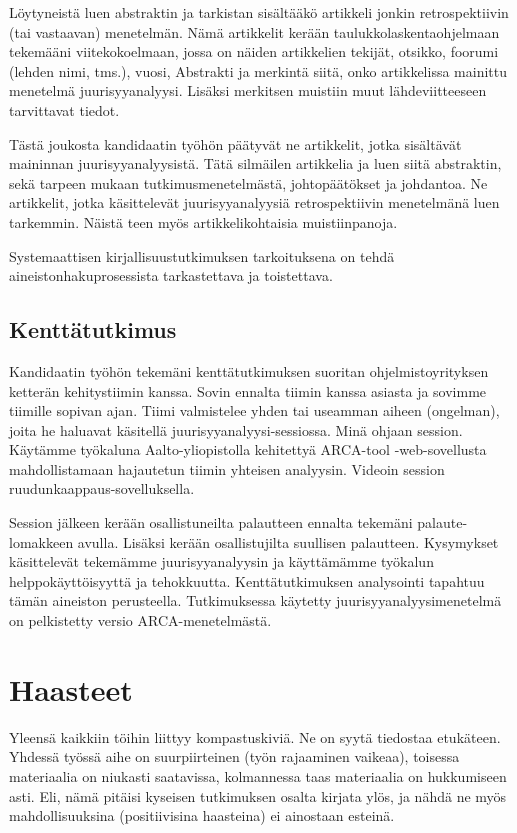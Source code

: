\documentclass[12pt,a4paper,finnish,oneside]{article}
\begin{document}
Löytyneistä luen abstraktin ja tarkistan sisältääkö artikkeli jonkin retrospektiivin (tai vastaavan) menetelmän. Nämä artikkelit kerään taulukkolaskentaohjelmaan tekemääni viitekokoelmaan, jossa on näiden artikkelien tekijät, otsikko, foorumi (lehden nimi, tms.), vuosi, Abstrakti ja merkintä siitä, onko artikkelissa mainittu menetelmä juurisyyanalyysi. Lisäksi merkitsen muistiin muut lähdeviitteeseen tarvittavat tiedot.

Tästä joukosta kandidaatin työhön päätyvät ne artikkelit, jotka sisältävät maininnan juurisyyanalyysistä. Tätä silmäilen artikkelia ja luen siitä abstraktin, sekä tarpeen mukaan tutkimusmenetelmästä, johtopäätökset ja johdantoa. Ne artikkelit, jotka käsittelevät juurisyyanalyysiä retrospektiivin menetelmänä luen tarkemmin. Näistä teen myös artikkelikohtaisia muistiinpanoja.

Systemaattisen kirjallisuustutkimuksen tarkoituksena on tehdä aineistonhakuprosessista tarkastettava ja toistettava.

\subsection{Kenttätutkimus}
Kandidaatin työhön tekemäni kenttätutkimuksen suoritan ohjelmistoyrityksen ketterän kehitystiimin kanssa. Sovin ennalta tiimin kanssa asiasta ja sovimme tiimille sopivan ajan. Tiimi valmistelee yhden tai useamman aiheen (ongelman), joita he haluavat käsitellä juurisyyanalyysi-sessiossa. Minä ohjaan session. Käytämme työkaluna Aalto-yliopistolla kehitettyä ARCA-tool -web-sovellusta mahdollistamaan hajautetun tiimin yhteisen analyysin. Videoin session ruudunkaappaus-sovelluksella. 

Session jälkeen kerään osallistuneilta palautteen ennalta tekemäni palaute-lomakkeen avulla. Lisäksi kerään osallistujilta suullisen palautteen. Kysymykset käsittelevät tekemämme juurisyyanalyysin ja käyttämämme työkalun helppokäyttöisyyttä ja tehokkuutta. Kenttätutkimuksen analysointi tapahtuu tämän aineiston perusteella. Tutkimuksessa käytetty juurisyyanalyysimenetelmä on pelkistetty versio ARCA-menetelmästä.

\section{Haasteet}

Yleensä kaikkiin töihin liittyy kompastuskiviä. Ne on syytä tiedostaa
etukäteen. Yhdessä työssä aihe on suurpiirteinen (työn rajaaminen
vaikeaa), toisessa materiaalia on niukasti saatavissa, kolmannessa
taas materiaalia on hukkumiseen asti.  Eli, nämä pitäisi kyseisen
tutkimuksen osalta kirjata ylös, ja nähdä ne myös mahdollisuuksina
(positiivisina haasteina) ei ainostaan esteinä.
\end{document}
